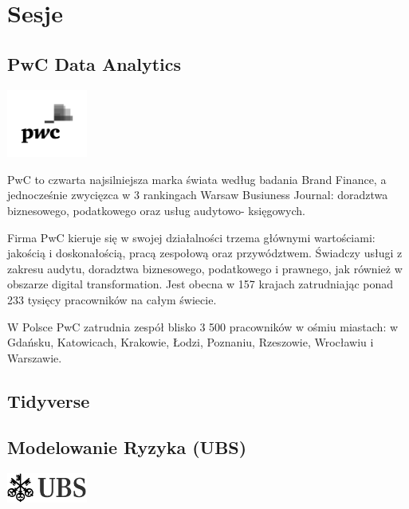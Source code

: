 \documentclass[11pt,twoside,b5paper]{book}
\begin{document}
\chapter{Sesje}{\LARGE}
\newpage
\section{PwC Data Analytics}
\begin{minipage}[t]{0.915\textwidth}
	\center     
    \includegraphics[width=100px]{img/PwC_logo_new.png} 
\end{minipage}

PwC to czwarta najsilniejsza marka świata według badania Brand Finance, a jednocześnie zwycięzca w 3 rankingach Warsaw Busiuness Journal: doradztwa biznesowego, podatkowego oraz usług audytowo- księgowych.

Firma PwC kieruje się w swojej działalności trzema głównymi wartościami: jakością i doskonałością, pracą zespołową oraz przywództwem. Świadczy usługi z zakresu audytu, doradztwa biznesowego, podatkowego i prawnego, jak również w obszarze digital transformation. Jest obecna w 157 krajach zatrudniając ponad 233 tysięcy pracowników na całym świecie.

W Polsce PwC zatrudnia zespół blisko 3 500 pracowników w ośmiu miastach: w Gdańsku, Katowicach, Krakowie, Łodzi, Poznaniu, Rzeszowie, Wrocławiu i Warszawie.

\newpage

\newpage
\section{Tidyverse}{}





\section{Modelowanie Ryzyka (UBS)}
\begin{minipage}[t]{0.915\textwidth}
	\center     
    \includegraphics[width=100px]{img/ubs.png} 
\end{minipage}
\end{document}
